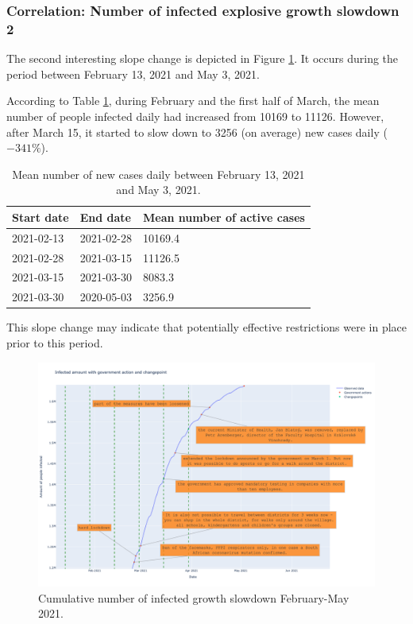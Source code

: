 \subsubsection{Correlation: Number of infected explosive growth slowdown 2}

The second interesting slope change is depicted in Figure \ref{fig:corr_inf_e_l_2}. It occurs during the period between February 13, 2021 and May 3, 2021.

According to Table \ref{tab:new_cases_mean_2}, during February and the first half of March, the mean number of people infected daily had increased from 10169 to 11126. However, after March 15, it started to slow down to 3256 (on average) new cases daily ($-341\%$). 

\begin{table}[!htb]
\centering
\begin{tabular}{|l|l|l|}
\hline
Start date & End date & Mean number of active cases \\ \hline
2021-02-13 & 2021-02-28 & 10169.4 \\ \hline
2021-02-28 & 2021-03-15 & 11126.5 \\ \hline
2021-03-15 & 2021-03-30 & 8083.3 \\ \hline
2021-03-30 & 2020-05-03 & 3256.9 \\ \hline
\end{tabular}
\caption{Mean number of new cases daily between February 13, 2021 and May 3, 2021.}
\label{tab:new_cases_mean_2}
\end{table}

This slope change may indicate that potentially effective restrictions were in place prior to this period.

\begin{figure}[!htb]
\centering
\includegraphics[width=1.0\textwidth, height=0.5\textwidth]{figures/chapter_04/changepoints_vs_government/infected_expo_to_lin_2nd}
\caption{Cumulative number of infected growth slowdown February-May 2021.}
\label{fig:corr_inf_e_l_2}
\end{figure}

